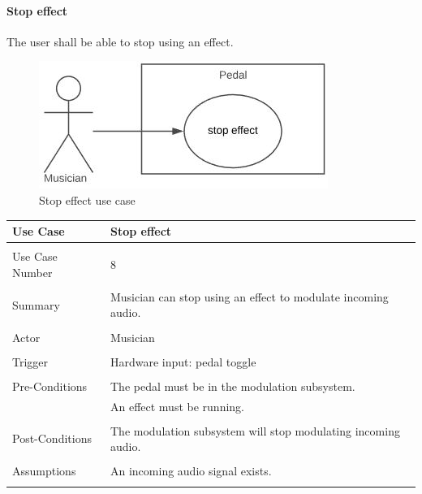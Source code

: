             \paragraph{Stop effect} 
            The user shall be able to stop using an effect.
            \begin{figure}[!ht]
                \centering
                \includegraphics[width=.5\textwidth]{diagrams/use_cases/uc-effect-stop.JPG}
                \caption{Stop effect use case}
                \label{fig:uc-stop-effect}
            \end{figure}
            \begin{table}[!ht]
                \centering
                \begin{tabular}{l l}
                    Use Case & Stop effect \\
                    \hline \\
                    Use Case Number & 8 \\ \\
                    Summary & Musician can stop using an effect to modulate incoming audio. \\ \\
                    Actor & Musician \\ \\
                    Trigger & Hardware input: pedal toggle \\ \\
                    Pre-Conditions & The pedal must be in the modulation subsystem. \\
                    & An effect must be running. \\ \\
                    Post-Conditions & The modulation subsystem will stop modulating incoming audio. \\ \\
                    Assumptions & An incoming audio signal exists.\\ \\
                \end{tabular}
            \end{table}
            
